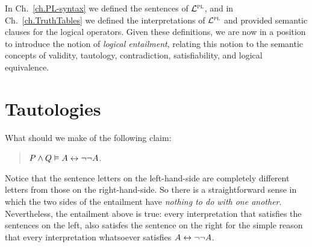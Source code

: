 %
%
%
%





In Ch.~\ref{ch.PL-syntax} we defined the sentences of $\mathcal{L}^{\textsc{pl}}$, and in Ch.~\ref{ch.TruthTables} we defined the interpretations of $\mathcal{L}^{\textsc{pl}}$ and provided semantic clauses for the logical operators.
Given these definitions, we are now in a position to introduce the notion of \textit{logical entailment}, relating this notion to the semantic concepts of validity, tautology, contradiction, satisfiability, and logical equivalence.




\section{Tautologies}

What should we make of the following claim:

\begin{quote}
  $P\wedge Q \vDash A\leftrightarrow\neg\neg A$.
\end{quote}

Notice that the sentence letters on the left-hand-side are completely different letters from those on the right-hand-side.
So there is a straightforward sense in which the two sides of the entailment have \emph{nothing to do with one another}.
Nevertheless, the entailment above is true: every interpretation that satisfies the sentences on the left, also satisfes the sentence on the right for the simple reason that every interpretation whatsoever satisfies $A\leftrightarrow\neg\neg A$.

